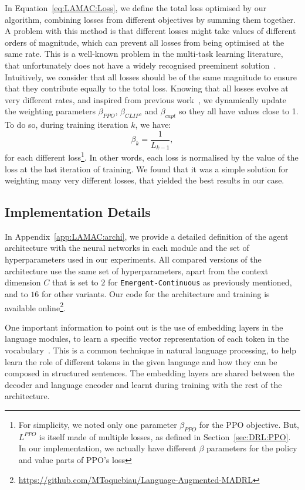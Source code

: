 In Equation~\ref{eq:LAMAC:Loss}, we define the total loss optimised by our algorithm, combining losses from different objectives by summing them together. A problem with this method is that different losses might take values of different orders of magnitude, which can prevent all losses from being optimised at the same rate. This is a well-known problem in the multi-task learning literature, that unfortunately does not have a widely recognised preeminent solution~\citep{Vandenhende2021_MultiTask}. Intuitively, we consider that all losses should be of the same magnitude to ensure that they contribute equally to the total loss. Knowing that all losses evolve at very different rates, and inspired from previous work~\citep{Liu2019_MTAN}, we dynamically update the weighting parameters $\beta_{PPO}$, $\beta_{CLIP}$,  and $\beta_{capt}$ so they all have values close to 1. To do so, during training iteration $k$, we have:
\begin{equation}
    \beta_k=\frac{1}{L_{k-1}},
\end{equation}
for each different loss\footnote{For simplicity, we noted only one parameter $\beta_{PPO}$ for the PPO objective. But, $L^{PPO}$ is itself made of multiple losses, as defined in Section~\ref{sec:DRL:PPO}. In our implementation, we actually have different $\beta$ parameters for the policy and value parts of PPO's loss}. In other words, each loss is normalised by the value of the loss at the last iteration of training. We found that it was a simple solution for weighting many very different losses, that yielded the best results in our case. 

\subsection{Implementation Details}\label{sec:LAMAC:ImpDetails}

In Appendix~\ref{app:LAMAC:archi}, we provide a detailed definition of the agent architecture with the neural networks in each module and the set of hyperparameters used in our experiments. All compared versions of the architecture use the same set of hyperparameters, apart from the context dimension $C$ that is set to $2$ for \texttt{Emergent-Continuous} as previously mentioned, and to $16$ for other variants. 
Our code for the architecture and training is available online\footnote{\url{https://github.com/MToquebiau/Language-Augmented-MADRL}}. 

One important information to point out is the use of embedding layers in the language modules, to learn a specific vector representation of each token in the vocabulary~\citep{Mikolov2013_Embedding}. This is a common technique in natural language processing, to help learn the role of different tokens in the given language and how they can be composed in structured sentences. The embedding layers are shared between the decoder and language encoder and learnt during training with the rest of the architecture. 
% 

